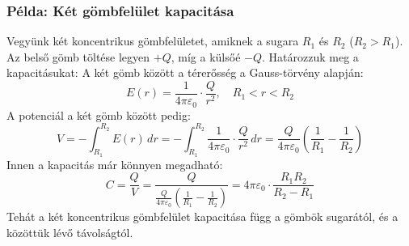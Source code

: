 \documentclass[../main.tex]{subfiles}
\begin{document}
\subsubsection*{Példa: Két gömbfelület kapacitása}
Vegyünk két koncentrikus gömbfelületet, amiknek a sugara $R_1$ és $R_2$ ($R_2 > R_1$). Az belső gömb töltése legyen $+Q$, míg a külsőé $-Q$. Határozzuk meg a kapacitásukat:
A két gömb között a térerősség a Gauss-törvény alapján:
\begin{equation}
    E(r) = \frac{1}{4 \pi \varepsilon_0} \cdot \frac{Q}{r^2}, \quad R_1 < r < R_2
\end{equation}
A potenciál a két gömb között pedig:
\begin{equation}
    V = - \int_{R_1}^{R_2} E(r) \, dr = - \int_{R_1}^{R_2} \frac{1}{4 \pi \varepsilon_0} \cdot \frac{Q}{r^2} \, dr = \frac{Q}{4 \pi \varepsilon_0} \left( \frac{1}{R_1} - \frac{1}{R_2} \right)
\end{equation}
Innen a kapacitás már könnyen megadható:
\begin{equation}
    C = \frac{Q}{V} = \frac{Q}{\frac{Q}{4 \pi \varepsilon_0} \left( \frac{1}{R_1} - \frac{1}{R_2} \right)} = 4 \pi \varepsilon_0 \cdot \frac{R_1 R_2}{R_2 - R_1}
\end{equation}
Tehát a két koncentrikus gömbfelület kapacitása függ a gömbök sugarától, és a közöttük lévő távolságtól.
\end{document}
